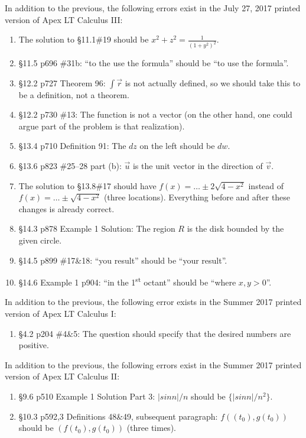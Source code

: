 \documentclass{amsart}
\newcommand{\ds}{\displaystyle}
\begin{document}
In addition to the previous, the following errors exist in the July 27, 2017 printed version of Apex LT Calculus III:
\begin{enumerate}
\item The solution to \S11.1\#19 should be $x^2+z^2=\frac1{(1+y^2)^2}$.
\item \S11.5 p696 \#31b: ``to the use the formula'' should be ``to use the formula''.
\item \S12.2 p727 Theorem 96: $\ds\int\vec r$ is not actually defined, so we should take this to be a definition, not a theorem.
\item \S12.2 p730 \#13: The function is not a vector (on the other hand, one could argue part of the problem is that realization).
\item \S13.4 p710 Definition 91: The $dz$ on the left should be $dw$.
\item \S13.6 p823 \#25--28 part (b): $\vec u$ is the unit vector in the direction of $\vec v$.
\item The solution to \S13.8\#17 should have $f(x)=\dots\pm2\sqrt{4-x^2}$ instead of $f(x)=\dots\pm\sqrt{4-x^2}$ (three locations).  Everything before and after these changes is already correct.
\item \S14.3 p878 Example 1 Solution: The region $R$ is the disk bounded by the given circle.
\item \S14.5 p899 \#17\&18: ``you result'' should be ``your result''.
\item \S14.6 Example 1 p904: ``in the 1\textsuperscript{st} octant'' should be ``where $x,y>0$''.
\label{2017-07-27III}
\end{enumerate}


In addition to the previous, the following error exists in the Summer 2017 printed version of Apex LT Calculus I:
\begin{enumerate}
\item \S4.2 p204 \#4\&5: The question should specify that the desired numbers are positive.
\label{2017-05-00I}
\end{enumerate}
\vspace{1in}

In addition to the previous, the following errors exist in the Summer 2017 printed version of Apex LT Calculus II:
\begin{enumerate}
\item \S9.6 p510 Example 1 Solution Part 3: $|sin n|/n$ should be $\{|sin n|/n^2\}$.
\item \S10.3 p592,3 Definitions 48\&49, subsequent paragraph: $f((t_0), g(t_0))$ should be $(f(t_0), g(t_0))$ (three times).
\label{2017-05-00II}
\end{enumerate}
\end{document}
